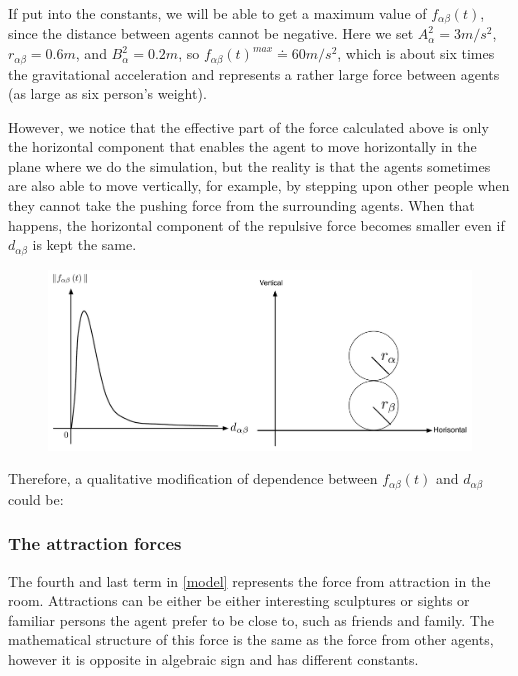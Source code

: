 If put into the constants, we will be able to get a maximum value of $ f_{\alpha\beta}(t) $, 
since the distance between agents cannot be negative. Here we set $ A_{\alpha}^{2} = 3 m/s^{2} $, 
$ r_{\alpha\beta} = 0.6 m $, and $ B_{\alpha}^{2} = 0.2 m $, so 
$ f_{\alpha\beta}(t)^{max} \doteq 60 m/s^{2} $, which is about six times the gravitational 
acceleration and represents a rather large force between agents (as large as six person's weight).

However, we notice that the effective part of the force calculated above is only the horizontal 
component that enables the agent to move horizontally in the plane where we do the simulation, 
but the reality is that the agents sometimes are also able to move vertically, for example, 
by stepping upon other people when they cannot take the pushing force from the surrounding agents. 
When that happens, the horizontal component of the repulsive force becomes smaller even if $ d_{\alpha\beta} $ 
is kept the same.	

\begin{figure}[ht]   
\centering
    {\includegraphics[scale=0.35]{Figures/ForceOverlapping.pdf}} 
    \caption{}
    \label{forceoverlapping}
\end{figure}

Therefore, a qualitative modification of dependence between $ f_{\alpha\beta}(t) $ and $ d_{\alpha\beta} $ could be:


\subsubsection{The attraction forces}
The fourth and last term in \eqref{model} represents the force from attraction 
in the room. Attractions can be either be either interesting sculptures or 
sights or familiar persons the agent prefer to be close to, such as friends 
and family. The mathematical structure of this force is the same as the force 
from other agents, however it is opposite in algebraic sign and has different 
constants. 

